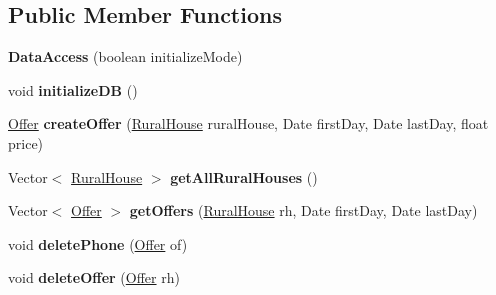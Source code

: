\subsection*{Public Member Functions}
\begin{DoxyCompactItemize}
\item 
\mbox{\label{classdata_access_1_1_data_access_a7999ee5a7ac4f0295bd0b7764e4f57cf}} 
{\bfseries Data\+Access} (boolean initialize\+Mode)
\item 
\mbox{\label{classdata_access_1_1_data_access_ab0490e80b8f3400fe2d8817abcf058c4}} 
void {\bfseries initialize\+DB} ()
\item 
\mbox{\label{classdata_access_1_1_data_access_ac07343daf9aa06679c7b28c082950ab0}} 
\mbox{\hyperlink{classdomain_1_1_offer}{Offer}} {\bfseries create\+Offer} (\mbox{\hyperlink{classdomain_1_1_rural_house}{Rural\+House}} rural\+House, Date first\+Day, Date last\+Day, float price)
\item 
\mbox{\label{classdata_access_1_1_data_access_a13b08775ff3b4b3859a7772de6592fb0}} 
Vector$<$ \mbox{\hyperlink{classdomain_1_1_rural_house}{Rural\+House}} $>$ {\bfseries get\+All\+Rural\+Houses} ()
\item 
\mbox{\label{classdata_access_1_1_data_access_ab8f58c04c48032a83b000d6de7f47d4e}} 
Vector$<$ \mbox{\hyperlink{classdomain_1_1_offer}{Offer}} $>$ {\bfseries get\+Offers} (\mbox{\hyperlink{classdomain_1_1_rural_house}{Rural\+House}} rh, Date first\+Day, Date last\+Day)
\item 
\mbox{\label{classdata_access_1_1_data_access_abd8f84251ff66d5376775b2740bdc46b}} 
void {\bfseries delete\+Phone} (\mbox{\hyperlink{classdomain_1_1_offer}{Offer}} of)
\item 
\mbox{\label{classdata_access_1_1_data_access_aa9afd19a1ccbde5244a13b7893ea534f}} 
void {\bfseries delete\+Offer} (\mbox{\hyperlink{classdomain_1_1_offer}{Offer}} rh)
\item 
\mbox{\label{classdata_access_1_1_data_access_ace8c90c27e0e185f25571244c4092d5e}} 

\end{DoxyCompactItemize}
